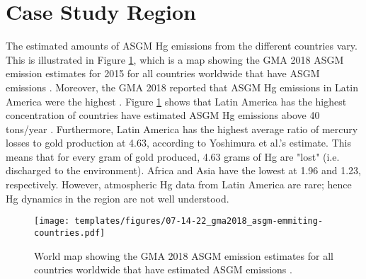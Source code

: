 \section{Case Study Region}
\begin{flushleft}
The estimated amounts of ASGM Hg emissions from the different countries vary. This is illustrated in Figure \ref{fig:global_asgm_emissions}, which is a map showing the GMA 2018 ASGM \hg emission estimates for 2015 for all countries worldwide that have ASGM \hg emissions \cite{united_nations_environment_programme_technical_2019}. Moreover, the GMA 2018 reported that ASGM Hg emissions in Latin America were the highest \cite{united_nations_environment_programme_technical_2019}. Figure \ref{fig:global_asgm_emissions} shows that Latin America has the highest concentration of countries have estimated ASGM Hg emissions above 40 tons/year \cite{united_nations_environment_programme_technical_2019}. Furthermore, Latin America has the highest average ratio of mercury losses to gold production at 4.63, according to Yoshimura et al.'s\cite{yoshimura_estimation_2021} estimate. This means that for every gram of gold produced, 4.63 grams of Hg are "lost" (i.e. discharged to the environment). Africa and Asia have the lowest at 1.96 and 1.23, respectively.  However, atmospheric Hg data from Latin America are rare; hence Hg dynamics in the region are not well understood. 
\end{flushleft}

\begin{figure}[H]
  \texttt{[image: templates/figures/07-14-22\_gma2018\_asgm-emmiting-countries.pdf]}
  \centering
  \caption[World map showing the GMA 2018 ASGM \hg emission estimates for all countries worldwide that have estimated ASGM \hg emissions]{World map showing the GMA 2018 ASGM \hg emission estimates for all countries worldwide that have estimated ASGM \hg emissions \cite{united_nations_environment_programme_technical_2019}.}
  \label{fig:global_asgm_emissions}
\end{figure}
\FloatBarrier

